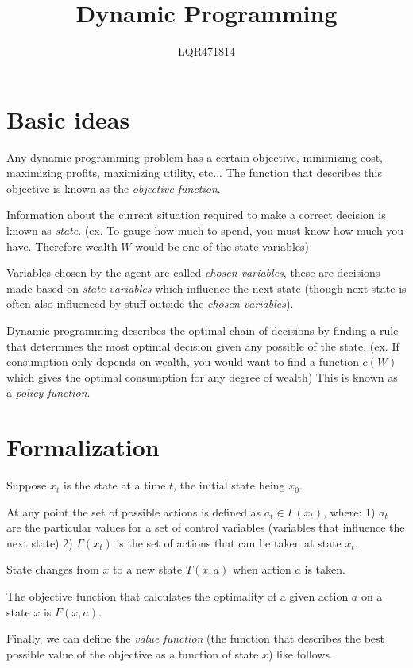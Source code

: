 \documentclass[a4paper, 12pt]{article}
\begin{document}
\title{Dynamic Programming}
\author{LQR471814}
\maketitle

\section{Basic ideas}

Any dynamic programming problem has a certain objective,
minimizing cost, maximizing profits, maximizing utility, etc...
The function that describes this objective is known as the
\emph{objective function}.

Information about the current situation required to make a correct
decision is known as \emph{state}. (ex. To gauge how much to
spend, you must know how much you have. Therefore wealth $W$ would
be one of the state variables)

Variables chosen by the agent are called \emph{chosen variables},
these are decisions made based on \emph{state variables} which
influence the next state (though next state is often also
influenced by stuff outside the \emph{chosen variables}).

Dynamic programming describes the optimal chain of decisions by
finding a rule that determines the most optimal decision given any
possible of the state. (ex. If consumption only depends on wealth,
you would want to find a function $c(W)$ which gives the optimal
consumption for any degree of wealth) This is known as a
\emph{policy function}.

\section{Formalization}

Suppose $x_{t}$ is the state at a time $t$, the initial state
being $x_{0}$.

At any point the set of possible actions is defined as $a_{t} \in
\Gamma(x_{t})$, where: 1) $a_{t}$ are the particular values for a
set of control variables (variables that influence the next state)
2) $\Gamma(x_{t})$ is the set of actions that can be taken at
state $x_{t}$.

State changes from $x$ to a new state $T(x, a)$ when action $a$ is
taken.

The objective function that calculates the optimality of a given
action $a$ on a state $x$ is $F(x, a)$.

Finally, we can define the \emph{value function} (the function
that describes the best possible value of the objective as a
function of state $x$) like follows.
\end{document}
